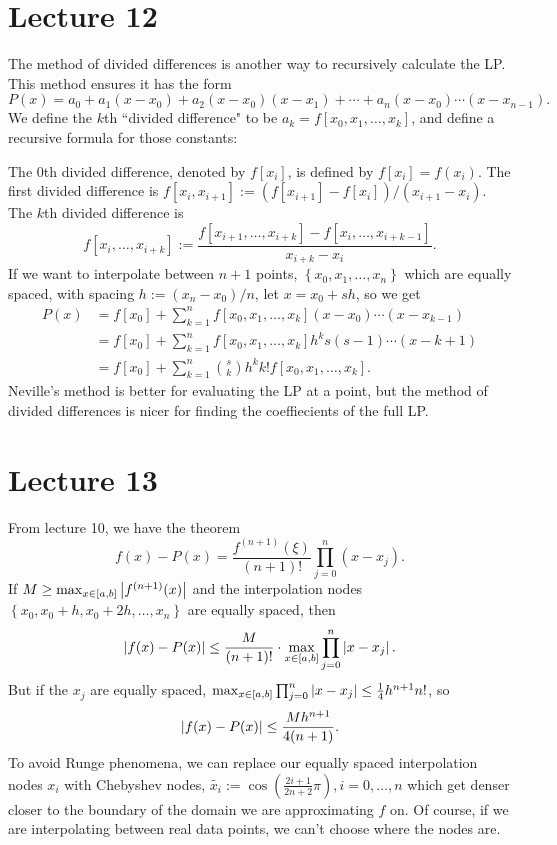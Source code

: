 \documentclass{article}
\begin{document}
\section{Lecture 12}
The method of divided differences is another way to recursively calculate the LP. This method ensures it has the form
\[ P(x) = a_0 + a_1 (x-x_0) + a_2(x-x_0)(x-x_1)+ \cdots + a_n(x-x_0)\cdots (x-x_{n-1}). \]
We define the $k$th ``divided difference" to be $a_k=f[x_0,x_1,\dots,x_k]$, and define a recursive formula for those constants:
\par
The 0th divided difference, denoted by $f[x_i]$, is defined by $f[x_i]=f(x_i)$. The first divided difference is $f[x_i,x_{i+1}] := (f[x_{i+1}]-f[x_i])/(x_{i+1}-x_i)$. The $k$th divided difference is
\[ f[x_i,\dots,x_{i+k}] := \frac{f[x_{i+1},\dots,x_{i+k}] - f[x_i,\dots,x_{i+k-1}]}{x_{i+k}-x_i}. \]
If we want to interpolate between $n+1$ points, $ \left\{ x_0, x_1, \dots,x_n \right\}$ which are equally spaced, with spacing $h := (x_n-x_0)/n$, let $x=x_0+sh$, so we get
\begin{align*}
    P(x) &= f[x_0] + \sum_{k=1}^n f[x_0, x_1, \dots, x_k] (x-x_0) \cdots (x-x_{k-1}) \\
         &= f[x_0] + \sum_{k=1}^n f[x_0, x_1, \dots, x_k]h^k s (s-1) \cdots (x-k+1) \\
         &= f[x_0] + \sum_{k=1}^n \binom{s}{k} h^k k! f[x_0, x_1, \dots, x_k].
\end{align*}
Neville's method is better for evaluating the LP at a point, but the method of divided differences is nicer for finding the coeffiecients of the full LP.

\section{Lecture 13}
From lecture 10, we have the theorem
\[ f(x)-P(x) = \frac{f^{(n+1)}(\xi)}{(n+1)!} \prod_{j=0}^n (x-x_j). \]
If $M \geq \max_{x \in [a,b]} \left\lvert f^{(n+1)}(x) \right\rvert$ and the interpolation nodes $ \left\{ x_0, x_0+h, x_0 + 2h, \dots, x_n \right\}$ are equally spaced, then
\[ \left\lvert f(x)-P(x) \right\rvert \leq \frac{M}{(n+1)!} \cdot \max_{x \in [a,b]} \prod_{j=0}^n \left\lvert x-x_j \right\rvert. \]
But if the $x_j$ are equally spaced, $\max_{x \in [a,b]} \prod_{j=0}^n \left\lvert x-x_j \right\rvert \leq \frac{1}{4} h^{n+1}n!$, so
\[ \left\lvert f(x)-P(x) \right\rvert \leq \frac{Mh^{n+1}}{4(n+1)}. \]
To avoid Runge phenomena, we can replace our equally spaced interpolation nodes $x_i$ with Chebyshev nodes, $\widetilde{x_i} := \cos \left( \frac{2i+1}{2n+2} \pi \right), i = 0, \dots, n$ which get denser closer to the boundary of the domain we are approximating $f$ on.
Of course, if we are interpolating between real data points, we can't choose where the nodes are.
\end{document}
